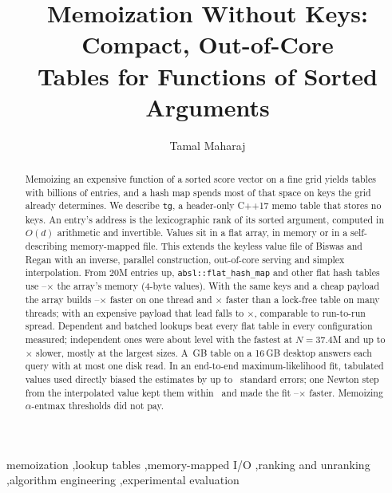 \documentclass[preprint,12pt]{elsarticle}
\newcommand{\tgl}{\texttt{tg}}
\newcommand{\absl}{\texttt{absl::\allowbreak flat\_\allowbreak hash\_\allowbreak map}}
\begin{document}
\begin{frontmatter}

\title{Memoization Without Keys: Compact, Out-of-Core\\
Tables for Functions of Sorted Arguments}

\author{Tamal Maharaj}
\address{Department of Computer Science, Ramakrishna Mission Vivekananda
Educational and Research Institute (RKMVERI), Belur, West Bengal, India}

\begin{abstract}
Memoizing an expensive function of a sorted score vector on a fine grid yields
tables with billions of entries, and a hash map spends most of that space on
keys the grid already determines. We describe \tgl, a header-only C++17 memo
table that stores no keys. An entry's address is the lexicographic rank of its
sorted argument, computed in $O(d)$ arithmetic and invertible. Values sit in a flat array, in memory or in a self-describing memory-mapped file.
This extends the keyless value file of Biswas and Regan with an inverse, parallel construction, out-of-core serving and simplex interpolation. From 20M entries up, \absl{} and other flat hash tables use \hMemFlatLo--\hMemFlatHi$\times$ the array's memory (4-byte values).
With the same keys and a cheap payload the array builds \hBuildAllLo--\hBuildAllHi$\times$ faster on one thread and \hParRatio$\times$
faster than a lock-free table on many threads; with an expensive payload that lead
falls to \hParPlRatio$\times$, comparable to run-to-run spread. Dependent and batched lookups beat every flat table in
every configuration measured; independent ones were about level with the fastest at $N=37.4$M and up to \hAllIndWorst$\times$ slower, mostly at the largest sizes.
A \hOocGB\,GB table on a 16\,GB
desktop answers each query with at most one disk read. In an end-to-end
maximum-likelihood fit, tabulated values used directly biased the estimates by
up to \hFitDzRawMax\ standard errors; one Newton step from the interpolated
value kept them within \hFitSNOneDzAll\ and made the fit
\hFitSNOneSpeedLo--\hFitSNOneSpeedHi$\times$ faster. Memoizing $\alpha$-entmax
thresholds did not pay.
\end{abstract}

\begin{keyword}
memoization \sep lookup tables \sep memory-mapped I/O \sep ranking and
unranking \sep algorithm engineering \sep experimental evaluation
\end{keyword}

\end{frontmatter}
\end{document}
